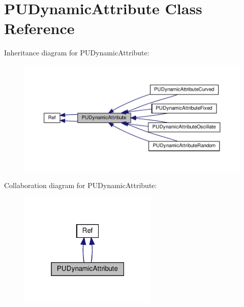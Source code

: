 \hypertarget{classPUDynamicAttribute}{}\section{P\+U\+Dynamic\+Attribute Class Reference}
\label{classPUDynamicAttribute}


Inheritance diagram for P\+U\+Dynamic\+Attribute\+:
\nopagebreak
\begin{figure}[H]
\begin{center}
\leavevmode
\includegraphics[width=350pt]{classPUDynamicAttribute__inherit__graph}
\end{center}
\end{figure}


Collaboration diagram for P\+U\+Dynamic\+Attribute\+:
\nopagebreak
\begin{figure}[H]
\begin{center}
\leavevmode
\includegraphics[width=187pt]{classPUDynamicAttribute__coll__graph}
\end{center}
\end{figure}
